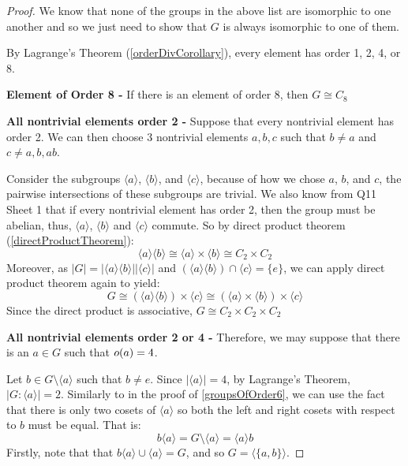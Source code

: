 \documentclass[../main.tex]{subfiles}
\begin{document}
\begin{proof}
  We know that none of the groups in the above list are isomorphic to one another and so we just need to show that $G$ is always isomorphic to one of them.

  By Lagrange's Theorem (\cref{orderDivCorollary}), every element has order 1, 2, 4, or 8.

  \textbf{Element of Order 8 - }
  If there is an element of order 8, then $G \cong C_8$ \tick

  \textbf{All nontrivial elements order 2 -}
  Suppose that every nontrivial element has order 2.
  We can then choose 3 nontrivial elements $a, b, c$ such that $b \neq a$ and $c \neq a, b, ab$.

  Consider the subgroups $\langle a \rangle$, $\langle b \rangle$, and $\langle c \rangle$, because of how we chose $a$, $b$, and $c$, the pairwise intersections of these subgroups are trivial.
  We also know from Q11 Sheet 1 that if every nontrivial element has order 2, then the group must be abelian, thus, $\langle a \rangle$, $\langle b \rangle$ and $\langle c \rangle$ commute.
  So by direct product theorem (\cref{directProductTheorem}):
  \[
    \langle a \rangle\langle b \rangle \cong \langle a \rangle \times \langle b \rangle \cong C_2 \times C_2
  \]
  Moreover, as $|G| = |\langle a \rangle\langle b \rangle||\langle c \rangle|$ and $(\langle a \rangle\langle b \rangle) \cap \langle c \rangle = \{ e\}$, we can apply direct product theorem again to yield:
  \[
    G \cong (\langle a \rangle \langle b \rangle) \times \langle c \rangle \cong (\langle a \rangle \times \langle b \rangle) \times \langle c \rangle  \]
  Since the direct product is associative, $G \cong C_2 \times C_2 \times C_2$ \tick

  \textbf{All nontrivial elements order 2 or 4 -}
  Therefore, we may suppose that there is an $a \in G$ such that $o(a) = 4$.

  Let $b \in G \setminus \langle a \rangle$ such that $b \neq e$.
  Since $|\langle a \rangle| = 4$, by Lagrange's Theorem, $|G : \langle a \rangle| = 2$.
  Similarly to in the proof of \cref{groupsOfOrder6}, we can use the fact that there is only two cosets of $\langle a \rangle$ so both the left and right cosets with respect to $b$ must be equal.
  That is:
  \[
    b \langle a \rangle = G \setminus \langle a \rangle = \langle a \rangle b
  \]
  Firstly, note that that $b\langle a \rangle \cup \langle a \rangle = G$, and so $G = \langle \{a, b\} \rangle$.


\end{proof}
\end{document}
